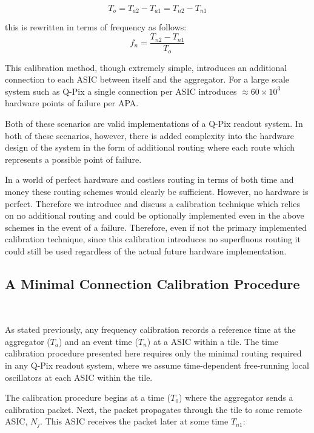\begin{equation}
  T_{o} = T_{a2} - T_{a1} = T_{n2} - T_{n1}
\end{equation}

this is rewritten in terms of frequency as follows:
\begin{equation}
  f_{n} = \frac{T_{n2} - T_{n1}}{T_{o}}
\end{equation}

This calibration method, though extremely simple, introduces an additional connection to each ASIC between itself and the aggregator.
For a large scale system such as Q-Pix a single connection per ASIC introduces $\approx 60\times 10^{3}$ hardware points of failure per APA.

Both of these scenarios are valid implementations of a Q-Pix readout system.
In both of these scenarios, however, there is added complexity into the hardware design of the system in the form of additional routing where each route which represents a possible point of failure.

In a world of perfect hardware and costless routing in terms of both time and money these routing schemes would clearly be sufficient.
However, no hardware is perfect.
Therefore we introduce and discuss a calibration technique which relies on no additional routing and could be optionally implemented even in the above schemes in the event of a failure.
Therefore, even if not the primary implemented calibration technique, since this calibration introduces no superfluous routing it could still be used regardless of the actual future hardware implementation.

\subsection{A Minimal Connection Calibration Procedure}~\label{sec:min_calib}

As stated previously, any frequency calibration records a reference time at the aggregator ($T_{a}$) and an event time ($T_{n}$) at a ASIC within a tile.
The time calibration procedure presented here requires only the minimal routing required in any Q-Pix readout system, where we assume time-dependent free-running local oscillators at each ASIC within the tile.

The calibration procedure begins at a time ($T_{0}$) where the aggregator sends a calibration packet.
Next, the packet propagates through the tile to some remote ASIC, $N_{j}$.
This ASIC receives the packet later at some time $T_{n1}$:

